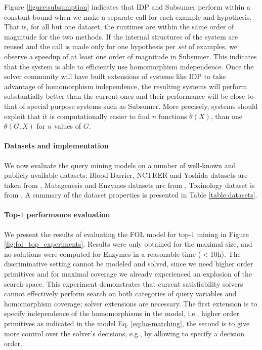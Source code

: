 Figure \ref{figure:subsumption} indicates that IDP and Subsumer perform within a constant bound when we make a separate call for each example and hypothesis. That is, for all but one dataset, the runtimes are within the same order of magnitude for the two methods. If the internal structures of the system are reused and the call is made only for one hypothesis per \emph{set} of examples, we observe a speedup of at least one order of magnitude in Subsumer. This indicates that the system is able to efficiently use homomorphism independence. Once the solver community will have built extensions of systems like IDP to take advantage of homomorphism independence, the resulting systems will perform substantially better than the current ones and their performance will be close to that of special purpose systems such as Subsumer. More precisely, systems should exploit that it is computationally easier to find $n$ functions $\theta(X)$, than one $\theta(G,X)$ for $n$ values of $G$. 

\paragraph{Datasets and implementation}
We now evaluate the query mining models on a number of well-known and publicly available datasets: Blood Barrier, NCTRER and Yoshida datasets are taken from \parencite{featureset}, Mutagenesis and Enzymes datasets are from \parencite{mutagenesis_and_enzymes_datasets}, Toxinology dataset is from \parencite{toxinologydatatset}. A summary of the dataset properties is presented in Table \ref{table:datasets}. 

\paragraph{Top-$1$ performance evaluation}
We present the results of evaluating the FOL model for top-$1$ mining in Figure \ref{fig:fol_top_experiments}. Results were only obtained for the maximal size, and no solutions were computed for Enzymes in a reasonable time ($<$10h). The discriminative setting cannot be modeled and solved, since we need higher order primitives and for maximal coverage we already experienced an explosion of the search space. This experiment demonstrates that current satisfiability solvers cannot effectively perform search on both categories of query variables and homomorphism coverage; solver extensions are necessary. The first extension is to specify independence of the homomorphisms in the model, i.e., higher order primitives as indicated in the model Eq. \ref{eq:ho-matching}, the second is to give more control over the solver's decisions, e.g., by allowing to specify a decision order.

